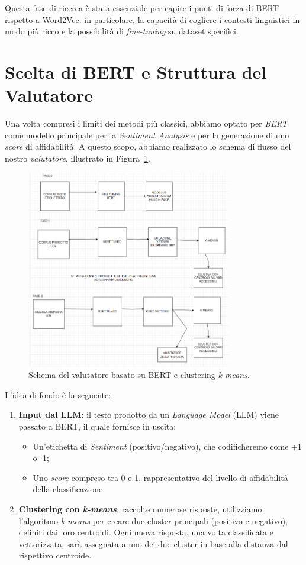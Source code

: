 \documentclass[a4paper,12pt]{article}
\begin{document}
Questa fase di ricerca è stata essenziale per capire i punti di forza di BERT rispetto a Word2Vec: in particolare, la capacità di cogliere i contesti linguistici in modo più ricco e la possibilità di \emph{fine-tuning} su dataset specifici.

\section*{Scelta di BERT e Struttura del Valutatore}
Una volta compresi i limiti dei metodi più classici, abbiamo optato per \emph{BERT} come modello principale per la \emph{Sentiment Analysis} e per la generazione di uno \emph{score} di affidabilità. A questo scopo, abbiamo realizzato lo schema di flusso del nostro \emph{valutatore}, illustrato in Figura~\ref{fig:flusso}.

\begin{figure}[h!]
    \centering
    \includegraphics[width=0.8\textwidth]{image.png} %
    \caption{Schema del valutatore basato su BERT e clustering \emph{k-means}.}
    \label{fig:flusso}
\end{figure}

L’idea di fondo è la seguente:
\begin{enumerate}
    \item \textbf{Input dal LLM}: il testo prodotto da un \emph{Language Model} (LLM) viene passato a BERT, il quale fornisce in uscita:
        \begin{itemize}
            \item Un’etichetta di \emph{Sentiment} (positivo/negativo), che codificheremo come +1 o -1;
            \item Uno \emph{score} compreso tra 0 e 1, rappresentativo del livello di affidabilità della classificazione.
        \end{itemize}
    \item \textbf{Clustering con \emph{k-means}}: raccolte numerose risposte, utilizziamo l’algoritmo \emph{k-means} per creare due cluster principali (positivo e negativo), definiti dai loro centroidi. Ogni nuova risposta, una volta classificata e vettorizzata, sarà assegnata a uno dei due cluster in base alla distanza dal rispettivo centroide.
\end{enumerate}
\end{document}
